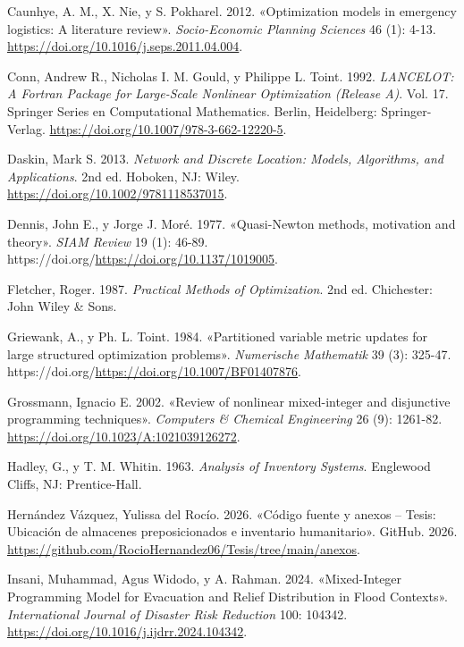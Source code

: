 \documentclass[
  spanish,
  us-letterpaper,
]{scrreprt}
\newlength{\cslhangindent}
\newenvironment{CSLReferences}[2] %
 {\begin{list}{}{%
  \setlength{\itemindent}{0pt}
  \setlength{\leftmargin}{0pt}
  \setlength{\parsep}{0pt}
  \ifodd #1
   \setlength{\leftmargin}{\cslhangindent}
   \setlength{\itemindent}{-1\cslhangindent}
  \fi
  \setlength{\itemsep}{#2\baselineskip}}}
 {\end{list}}
\numberwithin{equation}{section}
\begin{document}
\begin{CSLReferences}{1}{0}
Caunhye, A. M., X. Nie, y S. Pokharel. 2012. {«Optimization models in
emergency logistics: A literature review»}. \emph{Socio-Economic
Planning Sciences} 46 (1): 4-13.
\url{https://doi.org/10.1016/j.seps.2011.04.004}.

Conn, Andrew R., Nicholas I. M. Gould, y Philippe L. Toint. 1992.
\emph{LANCELOT: A Fortran Package for Large-Scale Nonlinear Optimization
(Release A)}. Vol. 17. Springer Series en Computational Mathematics.
Berlin, Heidelberg: Springer-Verlag.
\url{https://doi.org/10.1007/978-3-662-12220-5}.

Daskin, Mark S. 2013. \emph{Network and Discrete Location: Models,
Algorithms, and Applications}. 2nd ed. Hoboken, NJ: Wiley.
\url{https://doi.org/10.1002/9781118537015}.

Dennis, John E., y Jorge J. Moré. 1977. {«Quasi-{N}ewton methods,
motivation and theory»}. \emph{SIAM Review} 19 (1): 46-89.
https://doi.org/\url{https://doi.org/10.1137/1019005}.

Fletcher, Roger. 1987. \emph{Practical Methods of Optimization}. 2nd ed.
Chichester: John Wiley \& Sons.

Griewank, A., y Ph. L. Toint. 1984. {«Partitioned variable metric
updates for large structured optimization problems»}. \emph{Numerische
Mathematik} 39 (3): 325-47.
https://doi.org/\url{https://doi.org/10.1007/BF01407876}.

Grossmann, Ignacio E. 2002. {«Review of nonlinear mixed-integer and
disjunctive programming techniques»}. \emph{Computers \& Chemical
Engineering} 26 (9): 1261-82.
\url{https://doi.org/10.1023/A:1021039126272}.

Hadley, G., y T. M. Whitin. 1963. \emph{Analysis of Inventory Systems}.
Englewood Cliffs, NJ: Prentice-Hall.

Hernández Vázquez, Yulissa del Rocío. 2026. {«Código fuente y anexos --
Tesis: Ubicación de almacenes preposicionados e inventario
humanitario»}. GitHub. 2026.
\url{https://github.com/RocioHernandez06/Tesis/tree/main/anexos}.

Insani, Muhammad, Agus Widodo, y A. Rahman. 2024. {«Mixed-Integer
Programming Model for Evacuation and Relief Distribution in Flood
Contexts»}. \emph{International Journal of Disaster Risk Reduction} 100:
104342. \url{https://doi.org/10.1016/j.ijdrr.2024.104342}.


\end{CSLReferences}
\end{document}
